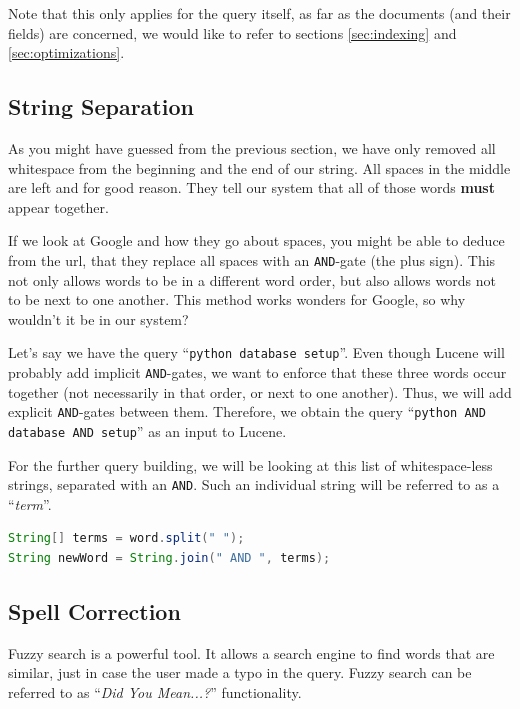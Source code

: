 \documentclass[11pt]{article}
\begin{document}
Note that this only applies for the query itself, as far as the documents (and their fields) are concerned, we would like to refer to sections \ref{sec:indexing} and \ref{sec:optimizations}.

\subsection{String Separation}
As you might have guessed from the previous section, we have only removed all whitespace from the beginning and the end of our string. All spaces in the middle are left and for good reason. They tell our system that all of those words \textbf{must} appear together.

If we look at Google and how they go about spaces, you might be able to deduce from the url, that they replace all spaces with an \texttt{AND}-gate (the plus sign). This not only allows words to be in a different word order, but also allows words not to be next to one another. This method works wonders for Google, so why wouldn't it be in our system?

Let's say we have the query ``\texttt{python database setup}''. Even though Lucene will probably add implicit \texttt{AND}-gates, we want to enforce that these three words occur together (not necessarily in that order, or next to one another). Thus, we will add explicit \texttt{AND}-gates between them. Therefore, we obtain the query ``\texttt{python AND database AND setup}'' as an input to Lucene.

For the further query building, we will be looking at this list of whitespace-less strings, separated with an \texttt{AND}. Such an individual string will be referred to as a ``\textit{term}''.
\begin{lstlisting}[language=Java]
String[] terms = word.split(" ");
String newWord = String.join(" AND ", terms);
\end{lstlisting}

\subsection{Spell Correction}
Fuzzy search is a powerful tool. It allows a search engine to find words that are similar, just in case the user made a typo in the query. Fuzzy search can be referred to as ``\textit{Did You Mean...?}'' functionality.
\end{document}

